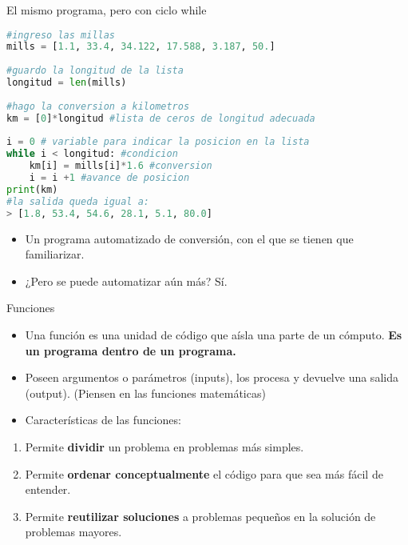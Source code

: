 \documentclass{beamer}
\begin{document}
\begin{frame}[fragile]{El mismo programa, pero con ciclo while}
\begin{lstlisting}[language=Python]
#ingreso las millas 
mills = [1.1, 33.4, 34.122, 17.588, 3.187, 50.] 
    
#guardo la longitud de la lista
longitud = len(mills)
    
#hago la conversion a kilometros
km = [0]*longitud #lista de ceros de longitud adecuada
    
i = 0 # variable para indicar la posicion en la lista
while i < longitud: #condicion
    km[i] = mills[i]*1.6 #conversion
    i = i +1 #avance de posicion
print(km)
#la salida queda igual a: 
> [1.8, 53.4, 54.6, 28.1, 5.1, 80.0] 
\end{lstlisting} \pause

\begin{itemize}
        \item Un programa automatizado de conversión, con el que se tienen que familiarizar. \pause
        \item ¿Pero se puede automatizar aún más? \pause Sí.
\end{itemize}
\end{frame}


\begin{frame}{Funciones} \pause
\begin{itemize}
    \item Una función es una unidad de código que aísla una parte de un cómputo. \textbf{Es un programa dentro de un programa.} \pause
    \item Poseen argumentos o parámetros (inputs), los procesa y devuelve una salida (output). \pause (Piensen en las funciones matemáticas) \pause
    \item Características de las funciones: \pause
\end{itemize}
\begin{enumerate}
    \item Permite \textbf{dividir} un problema en problemas más simples. \pause
    \item Permite \textbf{ordenar conceptualmente} el código para que sea más fácil de entender. \pause
    \item Permite \textbf{reutilizar soluciones} a problemas pequeños en la solución de problemas mayores. 
\end{enumerate}
\end{frame}
\end{document}
